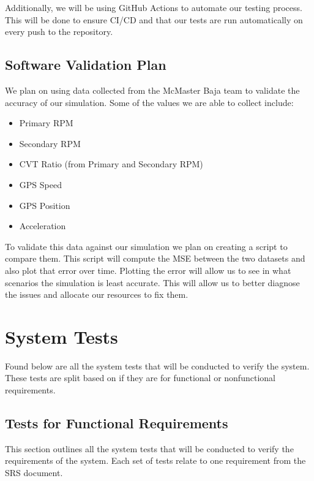 \documentclass[12pt, titlepage]{article}
\begin{document}
  \noindent Additionally, we will be using GitHub Actions to automate our testing process.
  This will be done to ensure CI/CD and that our tests are run automatically on every push to the repository.
\subsection{Software Validation Plan}

\noindent We plan on using data collected from the McMaster Baja team to validate the accuracy of our simulation.
Some of the values we are able to collect include:
\begin{itemize}
  \item Primary RPM
  \item Secondary RPM
  \item CVT Ratio (from Primary and Secondary RPM)
  \item GPS Speed
  \item GPS Position
  \item Acceleration
\end{itemize}

\noindent To validate this data against our simulation we plan on creating a script to compare them.
This script will compute the MSE between the two datasets and also plot that error over time.
Plotting the error will allow us to see in what scenarios the simulation is least accurate.
This will allow us to better diagnose the issues and allocate our resources to fix them.

\section{System Tests}

Found below are all the system tests that will be conducted to verify the system.
These tests are split based on if they are for functional or nonfunctional requirements.

\subsection{Tests for Functional Requirements}

This section outlines all the system tests that will be conducted to verify the requirements of the system.
Each set of tests relate to one requirement from the SRS document.
\end{document}
